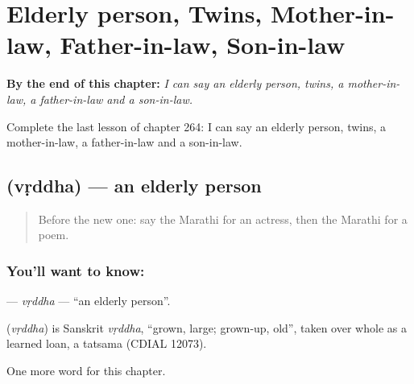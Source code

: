 
\chapter{Elderly person, Twins, Mother-in-law, Father-in-law, Son-in-law}
\label{ch:mr-elderly-person-twins-mother-in-law-father-in-law-son-in-law}

\begin{chapteropening}
\textbf{By the end of this chapter:} \emph{I can say an elderly person, twins, a mother-in-law, a father-in-law and a son-in-law.}

Complete the last lesson of chapter 264: I can say an elderly person, twins, a mother-in-law, a father-in-law and a son-in-law.
\end{chapteropening}

\section[\texorpdfstring{\mr{वृद्ध} (vṛddha)}{वृद्ध (vṛddha)}]{ (vṛddha) — an elderly person}

\label{lesson:MR-C264-vrddha}



\begin{quote}
Before the new one: say the Marathi for an actress, then the Marathi for a poem.
\end{quote}

\subsection*{You'll want to know: }
\textbf{} — \emph{vṛddha} — \textquotedblleft{}an elderly person\textquotedblright{}.

\begin{cousinweb}
\textbf{} (\emph{vṛddha}) is Sanskrit \emph{vṛddha}, \textquotedblleft{}grown, large; grown-up, old\textquotedblright{}, taken over whole as a learned loan, a tatsama (CDIAL 12073).
\end{cousinweb}

\begin{grammarlens}[title={What you've built}]
One more word for this chapter.
\end{grammarlens}

